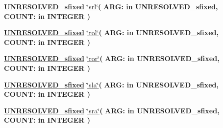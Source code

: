 \begin{DoxyCompactItemize}
\item 
{\bfseries {\bfseries {\bfseries \hyperlink{classfixed__pkg_aa723b28a027c3c0f9bca02d75e8df4d6}{U\+N\+R\+E\+S\+O\+L\+V\+E\+D\+\_\+sfixed}} \textcolor{vhdlchar}{ }}} \hyperlink{classfixed__pkg_a42f659825599b007f7db51c81d8093c9}{\char`\"{}srl\char`\"{}}{\bfseries  ( }{\bfseries \textcolor{vhdlchar}{A\+R\+G\+: }\textcolor{stringliteral}{in }\textcolor{vhdlchar}{U\+N\+R\+E\+S\+O\+L\+V\+E\+D\+\_\+sfixed}}{\bfseries  , \textcolor{vhdlchar}{C\+O\+U\+N\+T\+: }\textcolor{stringliteral}{in }{\bfseries \textcolor{comment}{I\+N\+T\+E\+G\+E\+R}\textcolor{vhdlchar}{ }}}{\bfseries  )} 
\item 
{\bfseries {\bfseries {\bfseries \hyperlink{classfixed__pkg_aa723b28a027c3c0f9bca02d75e8df4d6}{U\+N\+R\+E\+S\+O\+L\+V\+E\+D\+\_\+sfixed}} \textcolor{vhdlchar}{ }}} \hyperlink{classfixed__pkg_a2f2ff884511f426e12ca1e5401086cb0}{\char`\"{}rol\char`\"{}}{\bfseries  ( }{\bfseries \textcolor{vhdlchar}{A\+R\+G\+: }\textcolor{stringliteral}{in }\textcolor{vhdlchar}{U\+N\+R\+E\+S\+O\+L\+V\+E\+D\+\_\+sfixed}}{\bfseries  , \textcolor{vhdlchar}{C\+O\+U\+N\+T\+: }\textcolor{stringliteral}{in }{\bfseries \textcolor{comment}{I\+N\+T\+E\+G\+E\+R}\textcolor{vhdlchar}{ }}}{\bfseries  )} 
\item 
{\bfseries {\bfseries {\bfseries \hyperlink{classfixed__pkg_aa723b28a027c3c0f9bca02d75e8df4d6}{U\+N\+R\+E\+S\+O\+L\+V\+E\+D\+\_\+sfixed}} \textcolor{vhdlchar}{ }}} \hyperlink{classfixed__pkg_ab04d1270cdd250cd23cc132d3005bd68}{\char`\"{}ror\char`\"{}}{\bfseries  ( }{\bfseries \textcolor{vhdlchar}{A\+R\+G\+: }\textcolor{stringliteral}{in }\textcolor{vhdlchar}{U\+N\+R\+E\+S\+O\+L\+V\+E\+D\+\_\+sfixed}}{\bfseries  , \textcolor{vhdlchar}{C\+O\+U\+N\+T\+: }\textcolor{stringliteral}{in }{\bfseries \textcolor{comment}{I\+N\+T\+E\+G\+E\+R}\textcolor{vhdlchar}{ }}}{\bfseries  )} 
\item 
{\bfseries {\bfseries {\bfseries \hyperlink{classfixed__pkg_aa723b28a027c3c0f9bca02d75e8df4d6}{U\+N\+R\+E\+S\+O\+L\+V\+E\+D\+\_\+sfixed}} \textcolor{vhdlchar}{ }}} \hyperlink{classfixed__pkg_a6625058c74350c50e27506b5711606d1}{\char`\"{}sla\char`\"{}}{\bfseries  ( }{\bfseries \textcolor{vhdlchar}{A\+R\+G\+: }\textcolor{stringliteral}{in }\textcolor{vhdlchar}{U\+N\+R\+E\+S\+O\+L\+V\+E\+D\+\_\+sfixed}}{\bfseries  , \textcolor{vhdlchar}{C\+O\+U\+N\+T\+: }\textcolor{stringliteral}{in }{\bfseries \textcolor{comment}{I\+N\+T\+E\+G\+E\+R}\textcolor{vhdlchar}{ }}}{\bfseries  )} 
\item 
{\bfseries {\bfseries {\bfseries \hyperlink{classfixed__pkg_aa723b28a027c3c0f9bca02d75e8df4d6}{U\+N\+R\+E\+S\+O\+L\+V\+E\+D\+\_\+sfixed}} \textcolor{vhdlchar}{ }}} \hyperlink{classfixed__pkg_a5f4c31f8c3d28ee7eed2d15f6dcd2840}{\char`\"{}sra\char`\"{}}{\bfseries  ( }{\bfseries \textcolor{vhdlchar}{A\+R\+G\+: }\textcolor{stringliteral}{in }\textcolor{vhdlchar}{U\+N\+R\+E\+S\+O\+L\+V\+E\+D\+\_\+sfixed}}{\bfseries  , \textcolor{vhdlchar}{C\+O\+U\+N\+T\+: }\textcolor{stringliteral}{in }{\bfseries \textcolor{comment}{I\+N\+T\+E\+G\+E\+R}\textcolor{vhdlchar}{ }}}{\bfseries  )} 

\end{DoxyCompactItemize}
